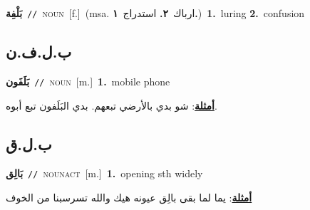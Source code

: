\documentclass[10pt,a4paper,twoside]{article} %
\begin{document}
\begin{multicols}{2}
{\setlength\topsep{0pt}\textbf{\foreignlanguage{arabic}{بَلْفِة}}\ {\color{gray}\texttt{//}\color{black}}\ \textsc{noun}\ [f.]\ \color{gray}(msa. \foreignlanguage{arabic}{ارباك}~\foreignlanguage{arabic}{\textbf{٢.}}  \foreignlanguage{arabic}{استدراج}~\foreignlanguage{arabic}{\textbf{١.}})\color{black}\ \textbf{1.}~luring  \textbf{2.}~confusion\ } \vspace{2mm}

\vspace{-3mm}
\subsection*{\color{blue}\foreignlanguage{arabic}{ب.ل.ف.ن}\color{blue}{ (ntws)}} 

{\setlength\topsep{0pt}\textbf{\foreignlanguage{arabic}{بَلَفَون}}\ {\color{gray}\texttt{//}\color{black}}\ \textsc{noun}\ [m.]\ \textbf{1.}~mobile phone\  \begin{flushright}\color{gray}\foreignlanguage{arabic}{\textbf{\underline{\foreignlanguage{arabic}{أمثلة}}}: شو بدي بالأرضي تبعهم. بدي البَلَفون تبع أبوه.}\end{flushright}\color{black}} \vspace{2mm}

\vspace{-3mm}
\subsection*{\color{blue}\foreignlanguage{arabic}{ب.ل.ق}\color{blue}{}} 

{\setlength\topsep{0pt}\textbf{\foreignlanguage{arabic}{بَالِق}}\ {\color{gray}\texttt{//}\color{black}}\ \textsc{noun\textunderscore act}\ [m.]\ \textbf{1.}~opening sth widely\  \begin{flushright}\color{gray}\foreignlanguage{arabic}{\textbf{\underline{\foreignlanguage{arabic}{أمثلة}}}: يما لما بقى بالِق عيونه هيك والله تسرسبنا من الخوف}\end{flushright}\color{black}} \vspace{2mm}


\end{multicols}
\end{document}
